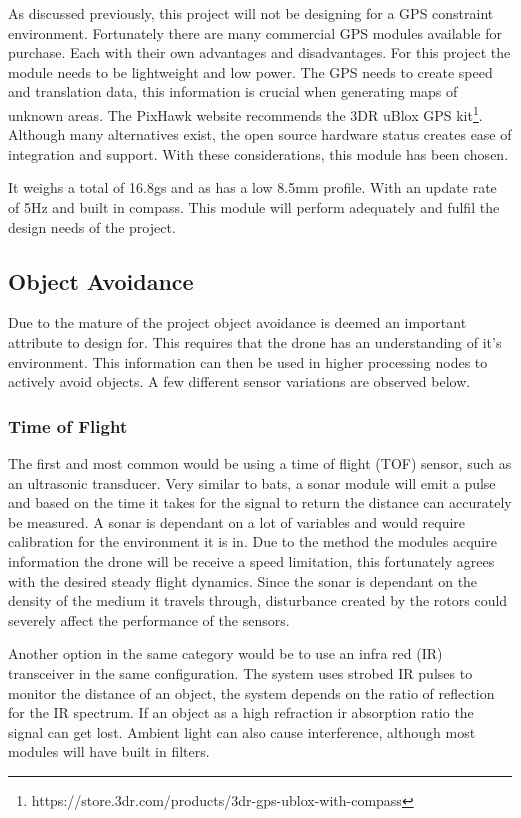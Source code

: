			As discussed previously, this project will not be designing for a GPS constraint environment. Fortunately there are many commercial  GPS modules available for purchase. Each with their own advantages and disadvantages. For this project the module needs to be lightweight and low power. The GPS needs to create speed and translation data, this information is crucial when generating maps of unknown areas. The PixHawk website recommends the 3DR uBlox GPS kit\footnote{https://store.3dr.com/products/3dr-gps-ublox-with-compass}. Although many alternatives exist, the open source hardware status creates ease of integration and support. With these considerations, this module has been chosen.
			
			It weighs a total of 16.8gs and as has a low 8.5mm profile. With an update rate of 5Hz and built in compass. This module will perform adequately and fulfil the design needs of the project.
		
			\subsection{Object Avoidance}\label{SECT_ObjectAvoidance}
			Due to the mature of the project object avoidance is deemed an important attribute to design for. This requires that the drone has an understanding of it's environment. This information can then be used in higher processing nodes to actively avoid objects. A few different sensor variations are observed below. 
		
				\subsubsection{Time of Flight}		
				The first and most common would be using a time of flight (TOF) sensor, such as an ultrasonic transducer. Very similar to bats, a sonar module will emit a pulse and based on the time it takes for the signal to return the distance can accurately be measured. A sonar is dependant on a lot of variables and would require calibration for the environment it is in. Due to the method the modules acquire information the drone will be receive a speed limitation, this fortunately agrees with the desired steady flight dynamics. Since the sonar is dependant on the density of the medium it travels through, disturbance created by the rotors could severely affect the performance of the sensors.
				
				Another option in the same category would be to use an infra red (IR) transceiver in the same configuration. The system uses strobed IR pulses to monitor the distance of an object, the system depends on the ratio of reflection for the IR spectrum. If an object as a high refraction ir absorption ratio the signal can get lost. Ambient light can also cause interference, although most modules will have built in filters.
				
